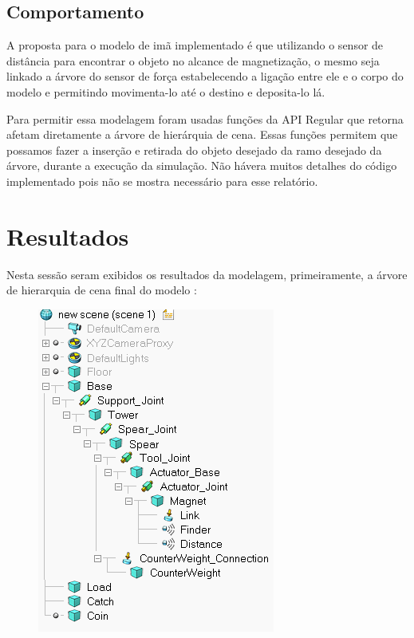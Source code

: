 \documentclass{article}
\begin{document}
            \subsection{Comportamento}
                
                A proposta para o modelo de imã implementado é que utilizando o sensor de distância para encontrar o objeto no alcance de magnetização, o mesmo seja linkado a árvore do sensor de força 
                estabelecendo a ligação entre ele e o corpo do modelo e permitindo movimenta-lo até o destino e deposita-lo lá.
                
                Para permitir essa modelagem foram usadas funções da API Regular que retorna afetam diretamente a árvore de hierárquia de cena. Essas funções permitem que possamos fazer a inserção e retirada do objeto desejado da ramo desejado da árvore,
                durante a execução da simulação. Não hávera muitos detalhes do código implementado pois não se mostra necessário para esse relatório.
            
    \section{Resultados}
            
            Nesta sessão seram exibidos os resultados da modelagem, primeiramente, a árvore de hierarquia de cena final do modelo :
                \begin{figure}[h]
                    \centering
                    \includegraphics[scale = .4]{images/Tree.png}
                \end{figure}
            
\end{document}
